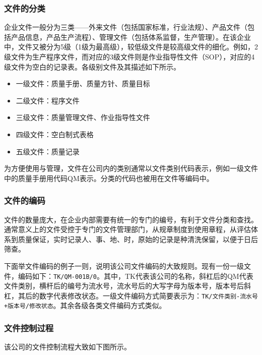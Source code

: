 \documentclass[cn,black,12pt,normal]{elegantnote}
\begin{document}
\subsubsection{文件的分类} 企业文件一般分为三类——外来文件（包括国家标准，行业法规）、产品文件（包括产品信息，产品生产流程）、管理文件（包括体系监督，生产管理）。在该企业中，文件又被分为5级（1级为最高级），较低级文件是较高级文件的细化。例如，2级文件为生产程序文件，而对应的3级文件则是作业指导性文件（SOP），对应的4级文件为空白的记录表。各级别文件及其描述如下所示。

\begin{itemize}
    \item 一级文件：质量手册、质量方针、质量目标
    \item 二级文件：程序文件
    \item 三级文件：质量管理文件、作业指导性文件
    \item 四级文件：空白制式表格
    \item 五级文件：质量记录
\end{itemize}

为方便使用与管理，文件在公司内的类别通常以文件类别代码表示，例如一级文件中的质量手册用代码QM表示。分类的代码也被用在文件等编码中。

\subsubsection{文件的编码} 文件的数量庞大，在企业内部需要有统一的专门的编号，有利于文件分类和查找。通常意义上的文件受控于专门的文件管理部门，从规章制度到使用章程，从评估体系到质量保证，实时记录人、事、地、时，原始的记录是种清洗保留，以便于日后筛查。

下面举文件编码的例子一则，说明该公司文件编码的大致规则。现有一份一级文件，编码如下：\texttt{TK/QM-001B/0}。其中，TK代表该公司的名称，斜杠后的QM代表文件类别，横杆后的编号为流水号，流水号后的大写字母为版本号，版本号后斜杠，其后的数字代表修改状态。一级文件编码方式简要表示为：\texttt{TK/文件类别-流水号+版本号/修改状态}。其余各级各类文件编码方式类似。

\subsubsection{文件控制过程}

该公司的文件控制流程大致如下图所示。
\end{document}

